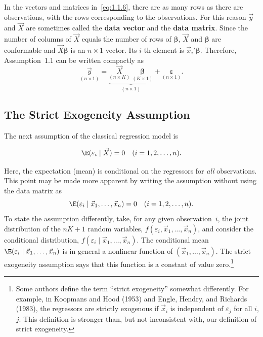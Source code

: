 In the vectors and matrices in~\eqref{eq:1.1.6}, there are as many rows as there are
observations, with the rows corresponding to the observations.  For this reason $\vec{y}$
and $\vec{X}$ are sometimes called the \textbf{data vector} and the \textbf{data matrix}.
Since the number of columns of $\vec{X}$ equals the number of rows of $\bm{\beta}$,
$\vec{X}$ and $\bm{\beta}$ are conformable and $\vec{X}\bm{\beta}$ is an $n \times 1$
vector.  Its $i$-th element is $\vec{x}_i'\bm{\beta}$.  Therefore, Assumption~1.1 can be
written compactly as
\[
  \underset{(n \times 1)}{\vec{y}}
  = \underbrace{
      \underset{(n \times K)}{\vec{X}} \;
      \underset{(K \times 1)}{\bm{\beta}}
    }_{(n \times 1)}
  + \underset{(n \times 1)}{\bm{\varepsilon}}.
\]

\subsection*{The Strict Exogeneity Assumption}

The next assumption of the classical regression model is

\begin{assumption}
\label{ass:strict_exogeneity}
\begin{equation}
  \E(\varepsilon_i \mid \vec{X}) = 0 \quad (i = 1, 2, \ldots, n).
  \label{eq:1.1.7}
\end{equation}
\end{assumption}

Here, the expectation (mean) is conditional on the regressors for \emph{all} observations.
This point may be made more apparent by writing the assumption without using the data
matrix as
\[
  \E(\varepsilon_i \mid \vec{x}_1, \ldots, \vec{x}_n) = 0
  \quad (i = 1, 2, \ldots, n).
\]
To state the assumption differently, take, for any given observation~$i$, the joint
distribution of the $nK + 1$ random variables,
$f(\varepsilon_i, \vec{x}_1, \ldots, \vec{x}_n)$, and consider the conditional
distribution, $f(\varepsilon_i \mid \vec{x}_1, \ldots, \vec{x}_n)$.  The conditional mean
$\E(\varepsilon_i \mid \vec{x}_1, \ldots, \vec{x}_n)$ is in general a nonlinear function
of $(\vec{x}_1, \ldots, \vec{x}_n)$.  The strict exogeneity assumption says that this
function is a constant of value zero.\footnote{Some authors define the term ``strict
exogeneity'' somewhat differently.  For example, in Koopmans and Hood (1953) and Engle,
Hendry, and Richards (1983), the regressors are strictly exogenous if $\vec{x}_i$ is
independent of $\varepsilon_j$ for all $i$, $j$.  This definition is stronger than, but
not inconsistent with, our definition of strict exogeneity.}

